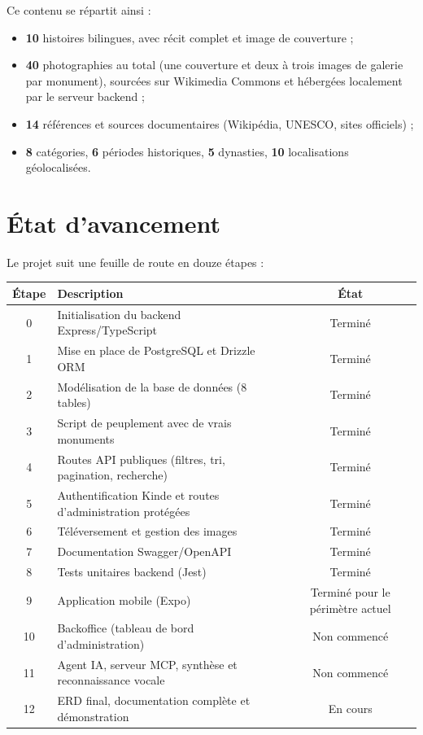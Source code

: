 \documentclass[11pt,a4paper]{article}
\begin{document}
Ce contenu se répartit ainsi :

\begin{itemize}[nosep]
    \item \textbf{10} histoires bilingues, avec récit complet et image de couverture ;
    \item \textbf{40} photographies au total (une couverture et deux à trois images de galerie par monument), sourcées sur Wikimedia Commons et hébergées localement par le serveur backend ;
    \item \textbf{14} références et sources documentaires (Wikipédia, UNESCO, sites officiels) ;
    \item \textbf{8} catégories, \textbf{6} périodes historiques, \textbf{5} dynasties, \textbf{10} localisations géolocalisées.
\end{itemize}

\section{État d'avancement}

Le projet suit une feuille de route en douze étapes :

\begin{center}
\begin{longtable}{@{}cp{9cm}c@{}}
\toprule
\textbf{Étape} & \textbf{Description} & \textbf{État} \\
\midrule
\endhead
0 & Initialisation du backend Express/TypeScript & Terminé \\
1 & Mise en place de PostgreSQL et Drizzle ORM & Terminé \\
2 & Modélisation de la base de données (8 tables) & Terminé \\
3 & Script de peuplement avec de vrais monuments & Terminé \\
4 & Routes API publiques (filtres, tri, pagination, recherche) & Terminé \\
5 & Authentification Kinde et routes d'administration protégées & Terminé \\
6 & Téléversement et gestion des images & Terminé \\
7 & Documentation Swagger/OpenAPI & Terminé \\
8 & Tests unitaires backend (Jest) & Terminé \\
9 & Application mobile (Expo) & Terminé pour le périmètre actuel \\
10 & Backoffice (tableau de bord d'administration) & Non commencé \\
11 & Agent IA, serveur MCP, synthèse et reconnaissance vocale & Non commencé \\
12 & ERD final, documentation complète et démonstration & En cours \\
\bottomrule
\end{longtable}
\end{center}
\end{document}
